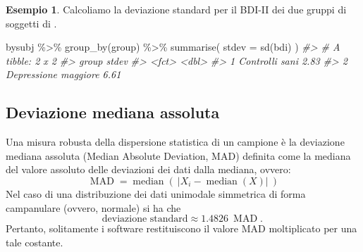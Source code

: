 \documentclass[
  10pt,
  italian,
  a4paper,
  extrafontsizes,onecolumn,openright
  ]{memoir}
\newenvironment{Shaded}{\begin{snugshade}}{\end{snugshade}}
\newcommand{\AttributeTok}[1]{\textcolor[rgb]{0.77,0.63,0.00}{#1}}
\newcommand{\CommentTok}[1]{\textcolor[rgb]{0.56,0.35,0.01}{\textit{#1}}}
\newcommand{\FunctionTok}[1]{\textcolor[rgb]{0.00,0.00,0.00}{#1}}
\newcommand{\NormalTok}[1]{#1}
\newcommand{\SpecialCharTok}[1]{\textcolor[rgb]{0.00,0.00,0.00}{#1}}
\theoremstyle{definition}
\theoremstyle{definition}
\newtheorem{example}{Esempio}[chapter]
\theoremstyle{definition}
\theoremstyle{definition}
\theoremstyle{remark}
\begin{document}
\begin{example}

Calcoliamo la deviazione standard per il BDI-II dei due gruppi di soggetti di \textcite{zetschefuture2019}.

\begin{Shaded}
\begin{Highlighting}[]
\NormalTok{bysubj }\SpecialCharTok{\%\textgreater{}\%} 
  \FunctionTok{group\_by}\NormalTok{(group) }\SpecialCharTok{\%\textgreater{}\%} 
  \FunctionTok{summarise}\NormalTok{(}
    \AttributeTok{stdev =} \FunctionTok{sd}\NormalTok{(bdi)}
\NormalTok{  ) }
\CommentTok{\#\textgreater{} \# A tibble: 2 x 2}
\CommentTok{\#\textgreater{}   group                stdev}
\CommentTok{\#\textgreater{}   \textless{}fct\textgreater{}                \textless{}dbl\textgreater{}}
\CommentTok{\#\textgreater{} 1 Controlli sani        2.83}
\CommentTok{\#\textgreater{} 2 Depressione maggiore  6.61}
\end{Highlighting}
\end{Shaded}

\end{example}

\hypertarget{deviazione-mediana-assoluta}{%
\subsection{Deviazione mediana assoluta}\label{deviazione-mediana-assoluta}}

Una misura robusta della dispersione statistica di un campione è la deviazione mediana assoluta (Median Absolute Deviation, MAD) definita come la mediana del valore assoluto delle deviazioni dei dati dalla mediana, ovvero:
\[
{\displaystyle \operatorname {MAD} =\operatorname {median} \left(\ \left|X_{i}-\operatorname {median} (X)\right|\ \right)}
\]
Nel caso di una distribuzione dei dati unimodale simmetrica di forma campanulare (ovvero, normale) si ha che
\[
{\displaystyle \text{deviazione standard} \approx 1.4826\ \operatorname {MAD} .\,}
\]
Pertanto, solitamente i software restituiscono il valore MAD moltiplicato per una tale costante.
\end{document}
